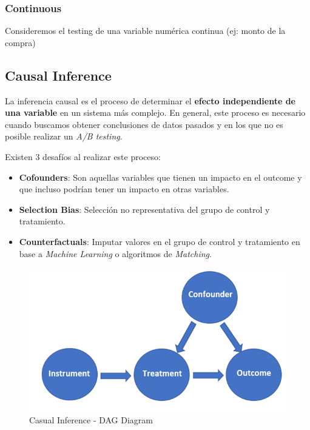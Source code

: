 \subsubsection{Continuous}

Consideremos el testing de una variable numérica continua (ej: monto de la compra)  

\subsection{Causal Inference}

La inferencia causal es el proceso de determinar el \textbf{efecto independiente de una variable} en un sistema más complejo. En general, este proceso es necesario cuando buscamos obtener conclusiones de datos pasados y en los que no es posible realizar un \textit{A/B testing}.

Existen 3 desafíos al realizar este proceso: 
\begin{itemize}
    \item \textbf{Cofounders}: Son aquellas variables que tienen un impacto en el outcome y que incluso podrían tener un impacto en otras variables. 
    \item \textbf{Selection Bias}: Selección no representativa del grupo de control y tratamiento.
    \item \textbf{Counterfactuals}: Imputar valores en el grupo de control y tratamiento en base a \textit{Machine Learning} o algoritmos de \textit{Matching}. 
\end{itemize}

\begin{figure}[H]
    \center
    \includegraphics[scale=0.3]{notebooks/STATS/img/causal_inference_diagram.png}
    \caption{Casual Inference - DAG Diagram}
\end{figure}


